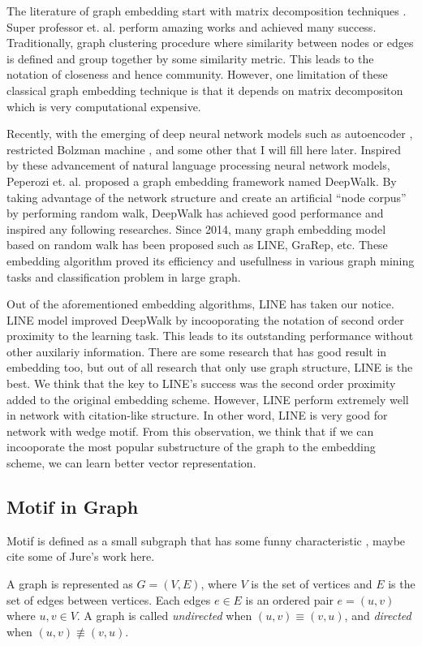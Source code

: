 \documentclass{sig-alternate-05-2015}
\begin{document}
The literature of graph embedding start with
matrix decomposition techniques \cite{la}. Super
professor et. al. perform amazing works
and achieved many success. Traditionally, graph
clustering procedure where similarity between
nodes or edges is defined and group together
by some similarity metric. This leads to the
notation of closeness and hence community.
However, one limitation of these classical 
graph embedding technique is that it depends 
on matrix decompositon which is very computational 
expensive.

Recently, with the emerging of deep neural network
models such as autoencoder \cite{la}, restricted 
Bolzman machine \cite{la}, and some other that I will
fill here later. Inspired by these advancement of
natural language processing neural network models,
Peperozi et. al. \cite{deepwalk} proposed a graph
embedding framework named DeepWalk. By taking advantage
of the network structure and create an artificial
``node corpus'' by performing random walk, DeepWalk
has achieved good performance and inspired any
following researches. Since 2014, many graph embedding
model based on random walk has been proposed such as
LINE, GraRep, etc. These embedding algorithm proved
its efficiency and usefullness in various graph
mining tasks and classification problem in large graph.

Out of the aforementioned embedding algorithms,
LINE has taken our notice. LINE model improved
DeepWalk by incooporating the notation of second
order proximity to the learning task. This leads
to its outstanding performance without other auxilariy
information. There are some research that has 
good result in embedding too, but out of all research
that only use graph structure, LINE is the best.
We think that the key to LINE's success was
the second order proximity added to the original
embedding scheme. However, LINE perform extremely well
in network with citation-like structure. In other word,
LINE is very good for network with wedge motif.
From this observation, we think that if we can 
incooporate the most popular substructure of the
graph to the embedding scheme, we can learn better
vector representation.

\subsection{Motif in Graph}
Motif is defined as a small subgraph that has
some funny characteristic \cite{la}, maybe cite some
of Jure's work here.

\begin{definition}
A graph is represented as $G = (V,E)$, where $V$ is the
set of vertices and $E$ is the set of edges between vertices.
Each edges $e \in E$ is an ordered pair $e = (u,v)$ where
$u, v \in V$. A graph is called \emph{undirected} when
$(u,v) \equiv (v,u)$, and \emph{directed} when $(u,v) \not\equiv (v,u)$.
\end{definition}
\end{document}
